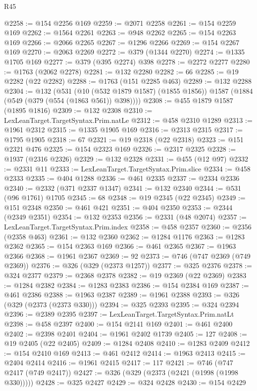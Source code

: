 \begin{lexlean}{R45}
\begin{coremodule}
@2258 := @154 @2256 @169
@2259 := @2071 @2258
@2261 := @154 @2259 @169
@2262 := @1564 @2261
@2263 := @948 @2262
@2265 := @154 @2263 @169
@2266 := @2066 @2265
@2267 := @1296 @2266
@2269 := @154 @2267 @169
@2270 := @2063 @2269
@2272 := @379 (@1344 @2270)
@2274 := @1335 @1705 @169
@2277 := @379 (@395 @2274) @398
@2278 := @2272 @2277
@2280 := @1763 (@2062 @2278)
@2281 := @132 @2280
@2282 := 66
@2285 := @19 @2282 (@22 @2282)
@2288 := @1763 (@151 @2285 @463)
@2289 := @132 @2288
@2304 := @132
    (@531
      (@10 (@532 @1879 @1587) (@1855 @1856))
      @1587
      (@1884 (@549 (@379 (@554 (@1863 @561)) @398))))
@2308 := @455 @1879 @1587 (@1895 @1816)
@2309 := @132 @2308
@2310 := LexLeanTarget.TargetSyntax.Prim.natLe
@2312 := @458 @2310 @1289
@2313 := @1961 @2312
@2315 := @1335 @1905 @169
@2316 := @2313 @2315
@2317 := @1795 @1905
@2318 := 67
@2321 := @19 @2318 (@22 @2318)
@2323 := @151 @2321 @476
@2325 := @154 @2323 @169
@2326 := @2317 @2325
@2328 := @1937 (@2316 @2326)
@2329 := @132 @2328
@2331 := @455 (@12 @97)
@2332 := @2331 @11
@2333 := LexLeanTarget.TargetSyntax.Prim.slice
@2334 := @458 @2333
@2335 := @404 @1288
@2336 := @461 @2335
@2337 := @2334 @2336
@2340 := @2332 (@371 @2337 @1347)
@2341 := @132 @2340
@2344 := @531 (@96 @1761) @1705
@2345 := 68
@2348 := @19 @2345 (@22 @2345)
@2349 := @151 @2348
@2350 := @461 @421
@2351 := @404 @2350
@2353 := @2344 (@2349 @2351)
@2354 := @132 @2353
@2356 := @2331 (@48 @2074)
@2357 := LexLeanTarget.TargetSyntax.Prim.index
@2358 := @458 @2357
@2360 := @2356 (@2358 @463)
@2361 := @132 @2360
@2362 := @1284 @1176
@2363 := @1283 @2362
@2365 := @154 @2363 @169
@2366 := @461 @2365
@2367 := @1963 @2366
@2368 := @1961 @2367
@2369 := 92
@2373 := @746 (@747 @2369 (@749 @2369))
@2376 := @326 (@329 (@2373 @1257))
@2377 := @325 @2376
@2378 := @324 @2377
@2379 := @2368 @2378
@2382 := @19 @2369 (@22 @2369)
@2383 := @1284 @2382
@2384 := @1283 @2383
@2386 := @154 @2384 @169
@2387 := @461 @2386
@2388 := @1963 @2387
@2389 := @1961 @2388
@2393 := @326 (@329 (@2373 (@2373 @330)))
@2394 := @325 @2393
@2395 := @324 @2394
@2396 := @2389 @2395
@2397 := LexLeanTarget.TargetSyntax.Prim.natLt
@2398 := @458 @2397
@2400 := @154 @2141 @169
@2401 := @461 @2400
@2402 := @2398 @2401
@2404 := @1961 @2402 @1739
@2405 := 127
@2408 := @19 @2405 (@22 @2405)
@2409 := @1284 @2408
@2410 := @1283 @2409
@2412 := @154 @2410 @169
@2413 := @461 @2412
@2414 := @1963 @2413
@2415 := @2404 @2414
@2416 := @1961 @2415
@2417 := 117
@2421 := @746 (@747 @2417 (@749 @2417))
@2427 := @326 (@329 (@2373 (@2421 (@1998 (@1998 @330)))))
@2428 := @325 @2427
@2429 := @324 @2428
@2430 := @154 @2429

\end{coremodule}
\end{lexlean}
